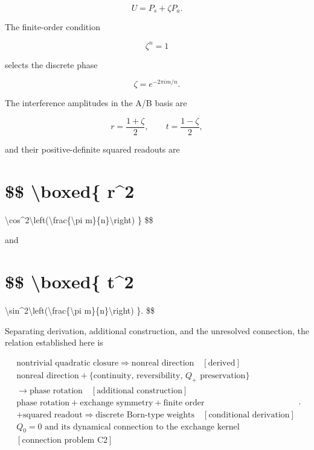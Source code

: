 \documentclass[
  a4paper,
  10pt]{article}
\begin{document}
\[
U=P_s+\zeta P_a.
\]

The finite-order condition

\[
\zeta^n=1
\]

selects the discrete phase

\[
\zeta=e^{-2\pi im/n}.
\]

The interference amplitudes in the A/B basis are

\[
r=\frac{1+\zeta}{2},
\qquad
t=\frac{1-\zeta}{2},
\]

and their positive-definite squared readouts are

\section{\$\$ \textbackslash boxed\{
\textbar r\textbar\^{}2}\label{-boxed-r2}

\textbackslash cos\^{}2\textbackslash left(\textbackslash frac\{\textbackslash pi
m\}\{n\}\textbackslash right) \} \$\$

and

\section{\$\$ \textbackslash boxed\{
\textbar t\textbar\^{}2}\label{-boxed-t2}

\textbackslash sin\^{}2\textbackslash left(\textbackslash frac\{\textbackslash pi
m\}\{n\}\textbackslash right) \}. \$\$

Separating derivation, additional construction, and the unresolved
connection, the relation established here is

\[
\boxed{
\begin{gathered}
\text{nontrivial quadratic closure}
\Rightarrow\text{nonreal direction}
\quad[\text{derived}]\\
\text{nonreal direction}
+\{\text{continuity, reversibility, }Q_+\text{ preservation}\}\\
\longrightarrow\text{phase rotation}
\quad[\text{additional construction}]\\
\text{phase rotation}+\text{exchange symmetry}+\text{finite order}\\
+\text{squared readout}
\Rightarrow\text{discrete Born-type weights}
\quad[\text{conditional derivation}]\\
Q_0=0\text{ and its dynamical connection to the exchange kernel}\\
[\text{connection problem C2}]
\end{gathered}
}.
\]
\end{document}
